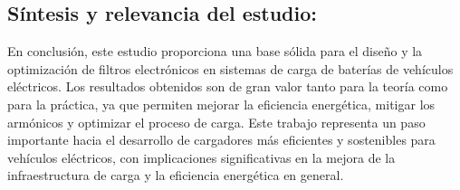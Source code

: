 \subsection{Síntesis y relevancia del estudio:}
En conclusión, este estudio proporciona una base sólida para el diseño y la optimización de
filtros electrónicos en sistemas de carga de baterías de vehículos eléctricos. Los resultados
obtenidos son de gran valor tanto para la teoría como para la práctica, ya que permiten
mejorar la eficiencia energética, mitigar los armónicos y optimizar el proceso de carga. Este
trabajo representa un paso importante hacia el desarrollo de cargadores más eficientes y
sostenibles para vehículos eléctricos, con implicaciones significativas en la mejora de la
infraestructura de carga y la eficiencia energética en general.